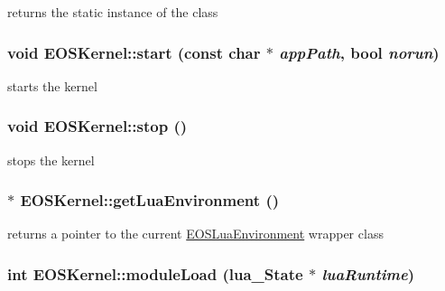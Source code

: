 returns the static instance of the class 

\hypertarget{structEOSKernel_6cbf49a8f46959908b08abaa969b0764}{
\subsubsection[{start}]{\setlength{\rightskip}{0pt plus 5cm}void EOSKernel::start (const char $\ast$ {\em appPath}, \/  bool {\em norun})}}
\label{structEOSKernel_6cbf49a8f46959908b08abaa969b0764}


starts the kernel 

\hypertarget{structEOSKernel_c0cf9a53338567326ad7e6388a54d208}{
\subsubsection[{stop}]{\setlength{\rightskip}{0pt plus 5cm}void EOSKernel::stop ()}}
\label{structEOSKernel_c0cf9a53338567326ad7e6388a54d208}


stops the kernel 

\hypertarget{structEOSKernel_dc571bb375ca531603c49e15bd5b5e1e}{
\subsubsection[{getLuaEnvironment}]{$\ast$ EOSKernel::getLuaEnvironment ()}}
\label{structEOSKernel_dc571bb375ca531603c49e15bd5b5e1e}


returns a pointer to the current \hyperlink{classEOSLuaEnvironment}{EOSLuaEnvironment} wrapper class 

\hypertarget{structEOSKernel_ed482eda9801f20453fdca40d91e7512}{
\subsubsection[{moduleLoad}]{\setlength{\rightskip}{0pt plus 5cm}int EOSKernel::moduleLoad (lua\_\-State $\ast$ {\em luaRuntime})}}
\label{structEOSKernel_ed482eda9801f20453fdca40d91e7512}


